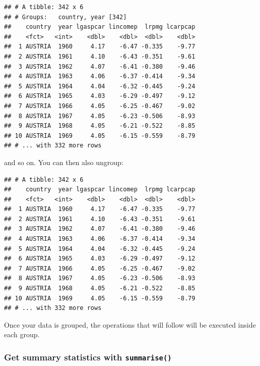 \documentclass[]{gitbook}
\newenvironment{Shaded}{\begin{snugshade}}{\end{snugshade}}
\newcommand{\KeywordTok}[1]{\textcolor[rgb]{0.13,0.29,0.53}{\textbf{#1}}}
\newcommand{\NormalTok}[1]{#1}
\newcommand{\OperatorTok}[1]{\textcolor[rgb]{0.81,0.36,0.00}{\textbf{#1}}}
\newcommand{\StringTok}[1]{\textcolor[rgb]{0.31,0.60,0.02}{#1}}
\begin{document}
\begin{verbatim}
## # A tibble: 342 x 6
## # Groups:   country, year [342]
##    country  year lgaspcar lincomep  lrpmg lcarpcap
##    <fct>   <int>    <dbl>    <dbl>  <dbl>    <dbl>
##  1 AUSTRIA  1960     4.17    -6.47 -0.335    -9.77
##  2 AUSTRIA  1961     4.10    -6.43 -0.351    -9.61
##  3 AUSTRIA  1962     4.07    -6.41 -0.380    -9.46
##  4 AUSTRIA  1963     4.06    -6.37 -0.414    -9.34
##  5 AUSTRIA  1964     4.04    -6.32 -0.445    -9.24
##  6 AUSTRIA  1965     4.03    -6.29 -0.497    -9.12
##  7 AUSTRIA  1966     4.05    -6.25 -0.467    -9.02
##  8 AUSTRIA  1967     4.05    -6.23 -0.506    -8.93
##  9 AUSTRIA  1968     4.05    -6.21 -0.522    -8.85
## 10 AUSTRIA  1969     4.05    -6.15 -0.559    -8.79
## # ... with 332 more rows
\end{verbatim}

and so on. You can then also ungroup:

\begin{Shaded}
\end{Shaded}

\begin{verbatim}
## # A tibble: 342 x 6
##    country  year lgaspcar lincomep  lrpmg lcarpcap
##    <fct>   <int>    <dbl>    <dbl>  <dbl>    <dbl>
##  1 AUSTRIA  1960     4.17    -6.47 -0.335    -9.77
##  2 AUSTRIA  1961     4.10    -6.43 -0.351    -9.61
##  3 AUSTRIA  1962     4.07    -6.41 -0.380    -9.46
##  4 AUSTRIA  1963     4.06    -6.37 -0.414    -9.34
##  5 AUSTRIA  1964     4.04    -6.32 -0.445    -9.24
##  6 AUSTRIA  1965     4.03    -6.29 -0.497    -9.12
##  7 AUSTRIA  1966     4.05    -6.25 -0.467    -9.02
##  8 AUSTRIA  1967     4.05    -6.23 -0.506    -8.93
##  9 AUSTRIA  1968     4.05    -6.21 -0.522    -8.85
## 10 AUSTRIA  1969     4.05    -6.15 -0.559    -8.79
## # ... with 332 more rows
\end{verbatim}

Once your data is grouped, the operations that will follow will be executed inside each group.

\hypertarget{get-summary-statistics-with-summarise}{%
\subsubsection{\texorpdfstring{Get summary statistics with \texttt{summarise()}}{Get summary statistics with summarise()}}\label{get-summary-statistics-with-summarise}}
\end{document}
